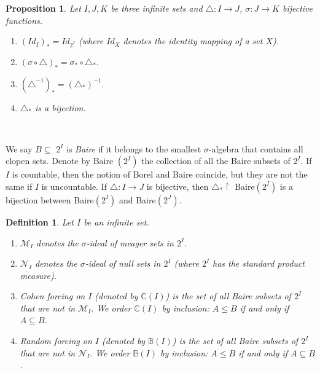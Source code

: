 \documentclass{article}%
\newtheorem{definition}[theorem]{Definition}
\newtheorem{proposition}[theorem]{Proposition}
\begin{document}
\begin{proposition}
Let $I,J,K$ be three infinite sets and $\triangle:I\longrightarrow J$,
$\sigma:J\longrightarrow K$ bijective functions. \label{prop estrellita}

\begin{enumerate}
\item $\left(  Id_{I}\right)  _{\ast}=Id_{2^{I}}$ (where $Id_{X}$ denotes the
identity mapping of a set $X$).

\item $\left(  \sigma\circ\triangle\right)  _{\ast}=\sigma_{\ast}%
\circ\triangle_{\ast}.$

\item $\left(  \triangle^{-1}\right)  _{\ast}=\left(  \triangle_{\ast}\right)
^{-1}.$

\item $\triangle_{\ast}$ is a bijection.
\end{enumerate}
\end{proposition}

\qquad\ \ \ \ 

We say $B\subseteq$ $2^{I}$ is \emph{Baire} if it belongs to the smallest
$\sigma$-algebra that contains all clopen sets. Denote by \textsf{Baire}%
$\left(  2^{I}\right)  $ the collection of all the Baire subsets of $2^{I}.$
If $I$ is countable, then the notion of Borel and Baire coincide, but they are
not the same if $I$ is uncountable. If $\triangle:I\longrightarrow J$ is
bijective, then $\triangle_{\ast}\upharpoonright$ \textsf{Baire}$\left(
2^{I}\right)  $ is a bijection between \textsf{Baire}$\left(  2^{I}\right)  $
and \textsf{Baire}$\left(  2^{J}\right)  .$

\begin{definition}
Let $I$ be an infinite set.

\begin{enumerate}
\item $\mathcal{M}_{I}$ denotes the $\sigma$-ideal of meager sets in $2^{I}.$

\item $\mathcal{N}_{I}$ denotes the $\sigma$-ideal of null sets in $2^{I}$
(where $2^{I}$ has the standard product measure).

\item Cohen forcing on $I$ (denoted by $\mathbb{C}\left(  I\right)  $) is the
set of all Baire subsets of $2^{I}$ that are not in $\mathcal{M}_{I}.$ We
order $\mathbb{C}\left(  I\right)  $ by inclusion: $A\leq B$ if and only if
$A\subseteq B$.

\item Random forcing on $I$ (denoted by $\mathbb{B}\left(  I\right)  $) is the
set of all Baire subsets of $2^{I}$ that are not in $\mathcal{N}_{I}.$ We
order $\mathbb{B}\left(  I\right)  $ by inclusion: $A\leq B$ if and only if
$A\subseteq B$.
\end{enumerate}
\end{definition}
\end{document}
